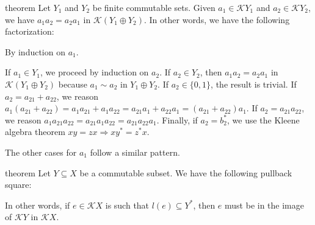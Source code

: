 \documentclass[a4paper,UKenglish,cleveref, autoref, thm-restate]{lipics-v2021}
\begin{document}
\begin{theoremEnd}{theorem}
  \label{thm:free-ka-comm-sum}
  Let $Y_{1}$ and $Y_{2}$ be finite commutable sets.  Given $a_{1}  \in  \mathcal{K}Y_{1}$ and
  $a_{2}  \in  \mathcal{K}Y_{2}$, we have $a_{1}a_{2} = a_{2}a_{1}$ in $\mathcal{K}(Y_{1} \oplus Y_{2})$.  In other
  words, we have the following factorization:
  \begin{center}
  \end{center}
\end{theoremEnd}

\begin{proofEnd}
  By induction on $a_{1}$.

  If $a_{1}  \in  Y_{1}$, we proceed by induction on $a_{2}$.  If $a_{2}  \in  Y_{2}$, then
  $a_{1}a_{2} = a_{2}a_{1}$ in $\mathcal{K}(Y_{1} \oplus Y_{2})$ because $a_{1}  \sim  a_{2}$ in $Y_{1} \oplus Y_{2}$.  If
  $a_{2}  \in  \{0,1\}$, the result is trivial.  If $a_{2} = a_{21} + a_{22}$, we reason
  $a_{1}(a_{21} + a_{22}) = a_{1}a_{21} + a_{1}a_{22} = a_{21}a_{1} + a_{22}a_{1} =
  (a_{21}+a_{22})a_{1}$.  If $a_{2}=a_{21}a_{22}$, we reason
  $a_1a_{21}a_{22} = a_{21}a_1a_{22} = a_{21}a_{22}a_1$.  Finally, if
  $a_2=b_2^*$, we use the Kleene algebra theorem $xy=zx  \Rightarrow  xy^* = z^*x$.

  The other cases for $a_{1}$ follow a similar pattern.
\end{proofEnd}


\begin{theoremEnd}{theorem}
  \label{thm:language-pullback}
  Let $Y  \subseteq  X$ be a commutable subset.  We have the following pullback square:
  \begin{center}
  \end{center}
  In other words, if $e  \in  \mathcal{K}X$ is such that $l(e)  \subseteq  Y^*$, then $e$ must
  be in the image of $\mathcal{K}Y$ in $\mathcal{K}X$.
\end{theoremEnd}
\end{document}

